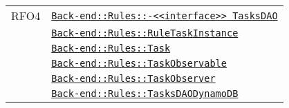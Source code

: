 \begin{longtable}{|>{\centering}m{3cm}|m{10cm}<{\centering}|}
RFO4 & \hyperref[Back-end::Rules::<<interface>> TasksDAO]{\texttt{Back-end::Rules::-\linebreak <<interface>> TasksDAO}}\\
& \hyperref[Back-end::Rules::RuleTaskInstance]{\texttt{Back-end::Rules::RuleTaskInstance}}\\
& \hyperref[Back-end::Rules::Task]{\texttt{Back-end::Rules::Task}}\\
& \hyperref[Back-end::Rules::TaskObservable]{\texttt{Back-end::Rules::TaskObservable}}\\
& \hyperref[Back-end::Rules::TaskObserver]{\texttt{Back-end::Rules::TaskObserver}}\\
& \hyperref[Back-end::Rules::TasksDAODynamoDB]{\texttt{Back-end::Rules::TasksDAODynamoDB}}\\ \hline


\end{longtable}
